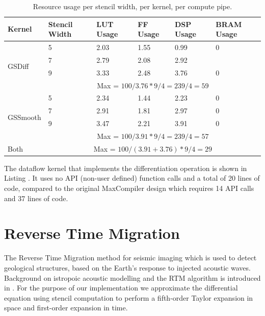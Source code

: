 \begin{table}[ht!]
  \begin{tabularx}{\textwidth}{X|X|X|X|X|X}
    Kernel                    & Stencil Width & LUT Usage & FF Usage & DSP Usage & BRAM Usage   \\
    \hline\hline
    \multirow{4}{*}{GSDiff}   & 5             & 2.03      & 1.55     & 0.99      & 0            \\
    & 7             & 2.79      & 2.08     & 2.92      &              \\
    & 9             & 3.33      & 2.48     & 3.76      & 0            \\
    \cline{2-6}
    & \multicolumn{5}{c}{Max = $100 / 3.76 * 9 / 4 = 239 / 4 = 59 $} \\
    \hline
    \multirow{4}{*}{GSSmooth} & 5             & 2.34      & 1.44     & 2.23      & 0            \\
    & 7             & 2.91      & 1.81     & 2.97      & 0            \\
    & 9             & 3.47      & 2.21     & 3.91      & 0            \\
    \cline{2-6}
    & \multicolumn{5}{c}{Max = $100 / 3.91 * 9 / 4 = 239 / 4 = 57 $} \\
    \hline
    Both                       & \multicolumn{5}{c}{Max = $100 / (3.91 + 3.76) * 9 / 4 = 29 $}  \\
  \end{tabularx}
  \caption{Resource usage per stencil width, per kernel, per compute pipe.}
  \label{table:nd2}
\end{table}


The \FAST{} dataflow kernel that implements the differentiation
operation is shown in Listing {}. It uses no API (non-user defined)
function calls and a total of 20 lines of code, compared to the
original MaxCompiler design which requires 14 API calls and 37 lines
of code.



\section{Reverse Time Migration}
\label{sec:RTM}
The Reverse Time Migration method for seismic imaging which is used to
detect geological structures, based on the Earth's response to
injected acoustic waves. Background on istropoic acoustic modelling
and the RTM algorithm is introduced in . For the
purpose of our implementation we approximate the differential equation
using stencil computation to perform a fifth-order Taylor expansion in
space and first-order expansion in time.

